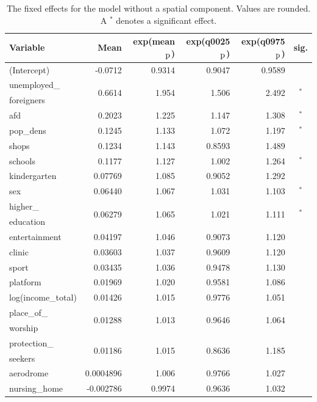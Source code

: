 \begin{table}[H] 
\caption{The fixed effects for the model without a spatial component. Values are rounded. A $^*$ denotes a significant effect.\label{fixedAllGermany}}
\begin{tabular}{l r r r r c}
\toprule
\textbf{Variable}	& \textbf{Mean}	& \textbf{exp(mean$_{\hbox{p}}$)} & \textbf{exp(q0025$_{\hbox{p}}$)} & \textbf{exp(q0975$_{\hbox{p}}$)} & \textbf{sig.}\\
\midrule
(Intercept) & -0.0712 & 0.9314 & 0.9047 & 0.9589 \\
unemployed\_ & \multirow{2}{*}{0.6614} & \multirow{2}{*}{1.954} & \multirow{2}{*}{1.506} & \multirow{2}{*}{2.492} & \multirow{2}{*}{$^*$}\\
foreigners \\
afd & 0.2023  & 1.225 & 1.147 & 1.308 & $^*$\\
pop\_dens & 0.1245 & 1.133 & 1.072 & 1.197 & $^*$\\
shops & 0.1234 & 1.143 & 0.8593 & 1.489 \\
schools & 0.1177 &1.127 & 1.002 & 1.264 & $^*$\\
kindergarten & 0.07769 & 1.085 & 0.9052 & 1.292 \\
sex & 0.06440 &1.067 & 1.031 & 1.103 & $^*$\\
higher\_ & \multirow{2}{*}{0.06279} & \multirow{2}{*}{1.065} & \multirow{2}{*}{1.021} & \multirow{2}{*}{1.111} & \multirow{2}{*}{$^*$} \\
education & \\
entertainment & 0.04197 & 1.046 & 0.9073 & 1.120 \\
clinic & 0.03603&  1.037 & 0.9609 & 1.120 \\
sport & 0.03435& 1.036 & 0.9478 & 1.130 \\
platform & 0.01969 &  1.020 & 0.9581 & 1.086 \\
log(income\_total) & 0.01426& 1.015 & 0.9776 & 1.051 \\
place\_of\_ & \multirow{2}{*}{0.01288} & \multirow{2}{*}{1.013} & \multirow{2}{*}{0.9646} & \multirow{2}{*}{1.064} \\
worship\\
protection\_ & \multirow{2}{*}{0.01186} & \multirow{2}{*}{1.015} & \multirow{2}{*}{0.8636} & \multirow{2}{*}{1.185} \\
seekers\\
aerodrome & 0.0004896 & 1.006 & 0.9766 & 1.027 \\
nursing\_home & -0.002786 & 0.9974 & 0.9636 & 1.032 \\ 

\end{tabular}
\end{table}
